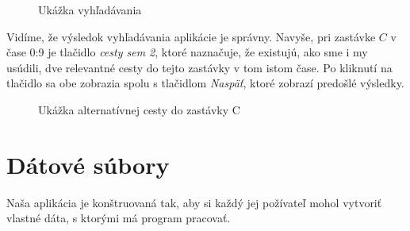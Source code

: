 \begin{figure}[H]
  \caption{Ukážka vyhľadávania}
  \label{ukazka_programu2}
\end{figure}

Vidíme, že výsledok vyhľadávania aplikácie je správny. Navyše, pri zastávke $C$ v čase 0:9 je tlačidlo \textit{cesty sem 2}, ktoré naznačuje, že existujú, ako sme i my usúdili, dve relevantné cesty do tejto zastávky v tom istom čase. Po kliknutí na tlačidlo sa obe zobrazia spolu s tlačidlom \textit{Naspäť}, ktoré zobrazí predošlé výsledky.\newline

\begin{figure}[H]
  \caption{Ukážka alternatívnej cesty do zastávky C}
  \label{ukazka_programu2_alt}
\end{figure}


\section{Dátové súbory}

Naša aplikácia je konštruovaná tak, aby si každý jej požívateľ mohol vytvoriť vlastné dáta, s ktorými má program pracovať.\newline

